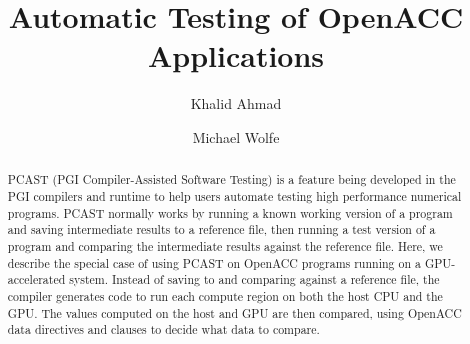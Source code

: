 \documentclass{llncs}
\begin{document}
\title{Automatic Testing of OpenACC Applications}
%
%
\author{Khalid Ahmad \and Michael Wolfe}
%
%
%

\maketitle              %

\begin{abstract}
PCAST (PGI Compiler-Assisted Software Testing) is a feature being developed in the PGI compilers and runtime to help users automate testing high performance numerical programs.
PCAST normally works by running a known working version of a program and saving intermediate results to a reference file, then running a test version of a program and comparing the intermediate results against the reference file.
Here, we describe the special case of using PCAST on OpenACC programs running on a GPU-accelerated system.
Instead of saving to and comparing against a reference file, the compiler generates code to run each compute region on both the host CPU and the GPU.
The values computed on the host and GPU are then compared, using OpenACC data directives and clauses to decide what data to compare.
\end{abstract}
%









%


\end{document}
